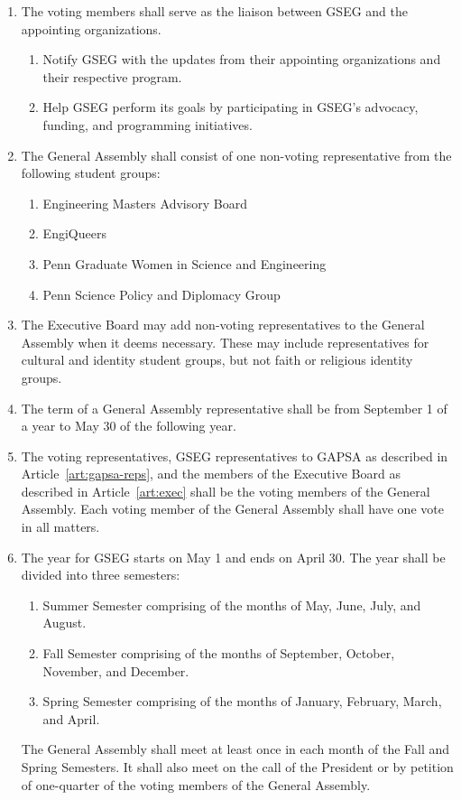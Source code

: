 \begin{enumerate}[label=\Alph*.]
	\item The voting members shall serve as the liaison between GSEG and the appointing
	organizations.
	\begin{enumerate}
		\item Notify GSEG with the updates from their appointing organizations and their
		respective program.
		\item Help GSEG perform its goals by participating in GSEG's advocacy, funding,
		and programming initiatives.
	\end{enumerate}

	\item The General Assembly shall consist of one non-voting representative from the following
	student groups:
	\begin{enumerate}[label=(\roman*)]
		\item Engineering Masters Advisory Board
		\item EngiQueers
		\item Penn Graduate Women in Science and Engineering
		\item Penn Science Policy and Diplomacy Group
	\end{enumerate}

	\item The Executive Board may add non-voting representatives to the General Assembly 
	when it deems necessary. These may include representatives for cultural and identity
	student groups, but	not faith or religious identity groups.  

	\item The term of a General Assembly representative shall be from September 1 of a year to 
	May 30 of the following year. 

	\item The voting representatives, GSEG representatives to GAPSA as described in 
	Article~\ref{art:gapsa-reps}, and the members of the Executive Board as described in 
	Article~\ref{art:exec} shall be the voting members of the General Assembly. Each voting member
	of the General Assembly	shall have one vote in all matters. 

	\item The year for GSEG starts on May 1 and ends on April 30. The year shall be divided into three semesters:
	\begin{enumerate}[label=(\roman*)]
		\item Summer Semester comprising of the months of May, June, July, and August. 
		\item Fall Semester comprising of the months of September, October, November, and December.
		\item Spring Semester comprising of the months of January, February, March, and April.
	\end{enumerate}
	The General Assembly shall meet at least once in each month of the Fall and Spring Semesters.
	It shall also meet on the call of the President or by petition of one-quarter of the voting
	members of the General Assembly.


\end{enumerate}
